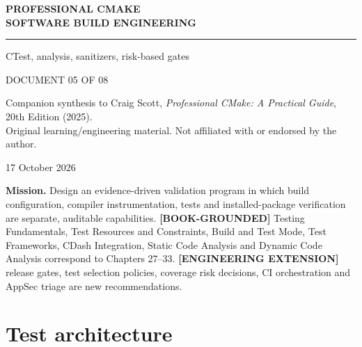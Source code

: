 \documentclass[11pt,letterpaper,oneside]{report}
\begin{document}
\hypersetup{pageanchor=false}\begin{titlepage}
\color{navy}
\vspace*{1.15in}
{\Large\bfseries PROFESSIONAL CMAKE\\[7pt]SOFTWARE BUILD ENGINEERING\par}
\vspace{0.32in}\noindent\textcolor{teal}{\rule{0.9\linewidth}{2.3pt}}\par
\vspace{0.45in}
\par
\vspace{0.3in}
{\Large\color{teal}CTest, analysis, sanitizers, risk-based gates\par}
\vfill
{\large DOCUMENT 05 OF 08\par}
\vspace{0.1in}
{\small Companion synthesis to Craig Scott, \emph{Professional CMake: A Practical Guide}, 20th Edition (2025).\\
Original learning/engineering material. Not affiliated with or endorsed by the author.\par}
\vspace{0.2in}
{\small 17 October 2026\par}
\end{titlepage}
\hypersetup{pageanchor=true}\clearpage{}\tableofcontents\clearpage{}

\textbf{Mission.} Design an evidence-driven validation program in which
build configuration, compiler instrumentation, tests and
installed-package verification are separate, auditable capabilities.
\textbf{{[}BOOK-GROUNDED{]}} Testing Fundamentals, Test Resources and
Constraints, Build and Test Mode, Test Frameworks, CDash Integration,
Static Code Analysis and Dynamic Code Analysis correspond to Chapters
27--33. \textbf{{[}ENGINEERING EXTENSION{]}} release gates, test
selection policies, coverage risk decisions, CI orchestration and AppSec
triage are new recommendations.

\chapter{Test architecture}\label{test-architecture}
\end{document}
